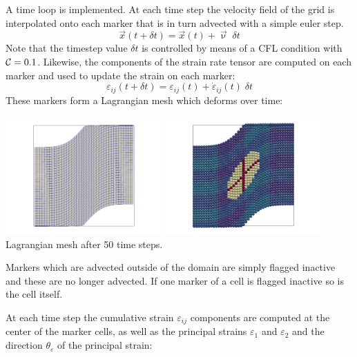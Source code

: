 A time loop is implemented. At each time step the velocity field of the grid is 
interpolated onto each marker that is in turn advected with a simple euler step. 
\[
\vec{x}(t+\delta t) = \vec{x}(t) + \vec\upnu \; \delta t
\]
Note that the timestep value $\delta t$ is controlled by means of a CFL condition 
with ${\cal C}=0.1$. Likewise, the components of the strain rate tensor are computed on each marker and 
used to update the strain on each marker:
\[
\varepsilon_{ij}(t+\delta t) = \varepsilon_{ij}(t) + \dot\varepsilon_{ij}(t) \; \delta t
\]
These markers form a Lagrangian mesh which deforms over time:
\begin{center}
\includegraphics[width=6cm]{python_codes/fieldstone_89/results/shearband/init/swarm_mesh}
\includegraphics[width=6cm]{python_codes/fieldstone_89/results/shearband/init/swarm_paint}\\
{\captionfont Lagrangian mesh after 50 time steps.}
\end{center}
Markers which are advected outside of the domain are simply flagged inactive and these
are no longer advected. If one marker of a cell is flagged inactive so is the cell itself. 

At each time step the cumulative strain $\varepsilon_{ij}$ components are
computed at the center of the marker cells, as well as the principal strains $\varepsilon_1$ 
and $\varepsilon_2$ and the direction $\theta_\varepsilon$ of the principal strain:

